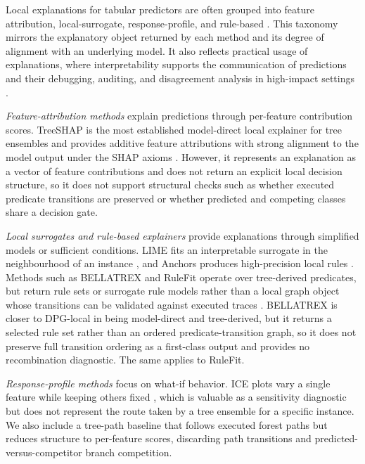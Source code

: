 \documentclass[runningheads]{llncs}
\begin{document}
Local explanations for tabular predictors are often grouped into feature attribution, local-surrogate, response-profile, and rule-based  \cite{poeta2023concept}. This taxonomy mirrors the explanatory object returned by each method and its degree of alignment with an underlying model. It also reflects practical usage of explanations, where interpretability supports the communication of predictions and their debugging, auditing, and disagreement analysis in high-impact settings \cite{doshi2017rigorous,LONGO2024102301}.

\textit{Feature-attribution methods} explain predictions through per-feature contribution scores. TreeSHAP is the most established model-direct local explainer for tree ensembles and provides additive feature attributions with strong alignment to the model output under the SHAP axioms \cite{lundberg2017unified,lundberg2018consistent}. However, it represents an explanation as a vector of feature contributions and does not return an explicit local decision structure, so it does not support structural checks such as whether executed predicate transitions are preserved or whether predicted and competing classes share a decision gate.

\textit{Local surrogates and rule-based explainers} provide explanations through simplified models or sufficient conditions. LIME fits an interpretable surrogate in the neighbourhood of an instance \cite{ribeiro2016why}, and Anchors produces high-precision local rules \cite{ribeiro2018anchors}. Methods such as BELLATREX and RuleFit operate over tree-derived predicates, but return rule sets or surrogate rule models rather than a local graph object whose transitions can be validated against executed traces \cite{dedja2023bellatrex,friedman2008predictive}. BELLATREX is closer to DPG-local in being model-direct and tree-derived, but it returns a selected rule set rather than an ordered predicate-transition graph, so it does not preserve full transition ordering as a first-class output and provides no recombination diagnostic. The same applies to RuleFit.

\textit{Response-profile methods} focus on what-if behavior. ICE plots vary a single feature while keeping others fixed \cite{goldstein2015ice}, which is valuable as a sensitivity diagnostic but does not represent the route taken by a tree ensemble for a specific instance. We also include a tree-path baseline \cite{palczewska2014interpreting} that follows executed forest paths but reduces structure to per-feature scores, discarding path transitions and predicted-versus-competitor branch competition.
\end{document}
